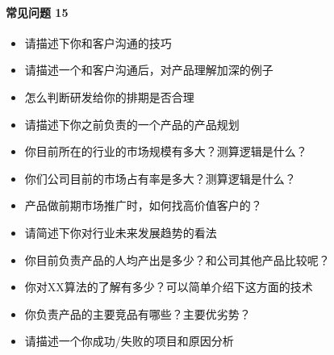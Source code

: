 \documentclass[letterpaper,11pt,english]{sphinxmanual}
\begin{document}
\paragraph{常见问题 15\sphinxfootnotemark[805]}
\label{\detokenize{chapter_interview/question:id17}}%
\begin{footnotetext}[805]\sphinxAtStartFootnote
{}
%
\end{footnotetext}\ignorespaces \begin{itemize}
\item {} 
请描述下你和客户沟通的技巧

\item {} 
请描述一个和客户沟通后，对产品理解加深的例子

\item {} 
怎么判断研发给你的排期是否合理

\item {} 
请描述下你之前负责的一个产品的产品规划

\item {} 
你目前所在的行业的市场规模有多大？测算逻辑是什么？

\item {} 
你们公司目前的市场占有率是多大？测算逻辑是什么？

\item {} 
产品做前期市场推广时，如何找高价值客户的？

\item {} 
请简述下你对行业未来发展趋势的看法

\item {} 
你目前负责产品的人均产出是多少？和公司其他产品比较呢？

\item {} 
你对XX算法的了解有多少？可以简单介绍下这方面的技术

\item {} 
你负责产品的主要竞品有哪些？主要优劣势？

\item {} 
请描述一个你成功/失败的项目和原因分析

\end{itemize}
\end{document}
